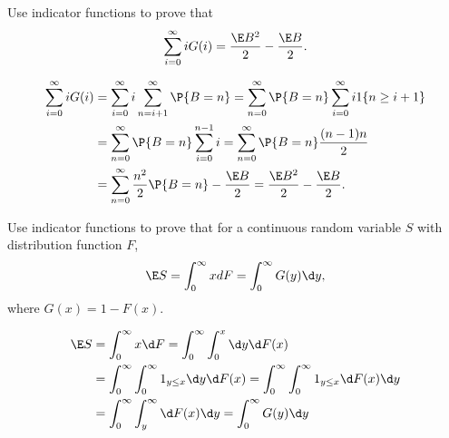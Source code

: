 \begin{question}
 Use indicator functions to prove that
    \begin{equation*}
\sum_{i=0}^\infty i G(i) =  \frac{\E B^2}2 - \frac{\E B}{2}.
    \end{equation*}
\begin{solution}
\begin{align*}
\sum_{i=0}^\infty i G(i)
&= \sum_{i=0}^\infty i \sum_{n=i+1}^\infty \P{B=n} = \sum_{n=0}^\infty \P{B=n} \sum_{i=0}^\infty i 1\{n\geq i+1\} \\
&= \sum_{n=0}^\infty \P{B=n} \sum_{i=0}^{n-1}i  = \sum_{n=0}^\infty \P{B=n} \frac{(n-1)n}{2} \\
&= \sum_{n=0}^\infty  \frac{n^2}{2} \P{B=n} - \frac{\E B}{2}
= \frac{\E B^2}2 - \frac{\E B}{2}.
\end{align*}
\end{solution}
\end{question}

\begin{question}
 Use indicator functions to prove that for  a continuous random
    variable $S$ with distribution function $F$, 
\begin{align*}
    \E S &= \int_0^\infty x dF  = \int_0^\infty G(y) \d y,\\
\end{align*}
where $G(x) = 1 - F(x)$. 
\begin{solution}
\begin{equation*}
  \begin{split}
    \E S &= \int_0^\infty x \d F  = \int_0^\infty \int_0^x \d y \d F(x) \\
    & = \int_0^\infty \int_0^\infty 1_{y\leq x} \d y \d F(x)   = \int_0^\infty \int_0^\infty 1_{y\leq x} \d F(x) \d y\\
    & = \int_0^\infty \int_y^\infty \d F(x) \d y = \int_0^\infty G(y) \d y
  \end{split}
\end{equation*}
\end{solution}
\end{question}

